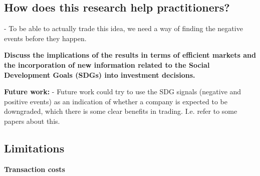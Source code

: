 \subsection{How does this research help practitioners?}
- To be able to actually trade this idea, we need a way of finding the negative events before they happen. 


\textbf{Discuss the implications of the results in terms of efficient markets and the incorporation of new information related to the Social Development Goals (SDGs) into investment decisions.}


\textbf{Future work:}
- Future work could try to use the SDG signals (negative and positive events) as an indication of whether a company is expected to be downgraded, which there is some clear benefits in trading. I.e. refer to some papers about this. 

\subsection{Limitations}


\textbf{Transaction costs}
